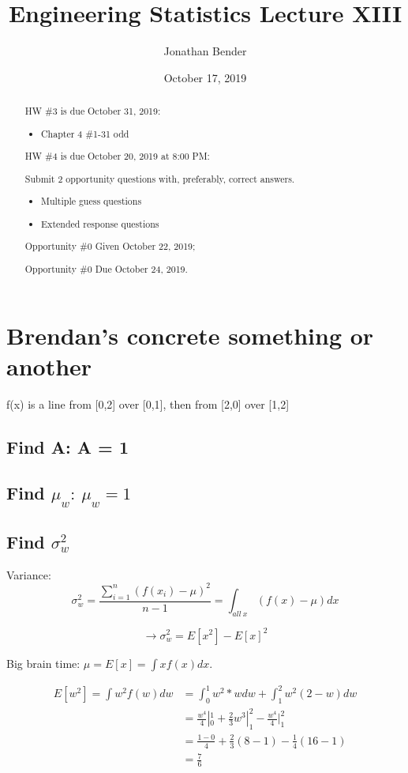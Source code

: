 \documentclass[]{article}
\title{Engineering Statistics Lecture XIII}
\author{Jonathan Bender}
\date{October 17, 2019}
\begin{document}
	
	\maketitle
	
	\begin{abstract}	
		HW \#3 is due October 31, 2019:
		\begin{itemize}
			\item Chapter 4 \#1-31 odd
		\end{itemize}
	
		HW \#4 is due October 20, 2019 at 8:00 PM:
		
		Submit 2 opportunity questions with, preferably, correct answers.
		\begin{itemize}
			\item Multiple guess questions
			\item Extended response questions
		\end{itemize}
	
		Opportunity \#0 Given October 22, 2019;
		
		Opportunity \#0 Due October 24, 2019.
	\end{abstract}
	
	\section{Brendan's concrete something or another}
		f(x) is a line from [0,2] over [0,1], then from [2,0] over [1,2]
		\subsection{Find A: A = 1}
		\subsection{Find $\mu_w:\ \mu_w = 1$}
	
	
		\pagebreak
		\subsection{Find $\sigma_w^2$}
			Variance: $$ \sigma_w^2 = \dfrac{\sum_{i=1}^{n}(f(x_i) - \mu)^2}{n-1} = \int_{all\ x}(f(x) - \mu)dx$$
		
			$$\to \sigma_w^2 = E[x^2] - E[x]^2$$
		
			Big brain time: $\mu = E[x] = \int xf(x)dx$.
	
			\begin{align*}
				E[w^2] = \int w^2f(w)dw &= \int_0^1 w^2*wdw + \int_1^2 w^2(2-w)dw \\
				&= \frac{w^4}{4}|_0^1 + \frac{2}{3}w^3|_1^2 - \frac{w^4}{4}|_1^2\\
				&= \frac{1-0}{4} + \frac{2}{3}(8-1) - \frac{1}{4}(16 - 1)\\
				&= \frac{7}{6}
			\end{align*}
	
\end{document}
